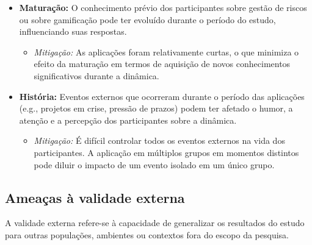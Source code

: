 \documentclass[
	12pt,
	openright,
	twoside,
	a4paper,
	english,
	brazil
	]{abntex2}
\begin{document}
\begin{itemize}
\begin{itemize}
    \end{itemize}
  \item \textbf{Maturação:} O conhecimento prévio dos participantes sobre gestão de riscos ou sobre gamificação pode ter evoluído durante o período do estudo, influenciando suas respostas.
    \begin{itemize}
    \item \textit{Mitigação:} As aplicações foram relativamente curtas, o que minimiza o efeito da maturação em termos de aquisição de novos conhecimentos significativos durante a dinâmica.
    \end{itemize}
  \item \textbf{História:} Eventos externos que ocorreram durante o período das aplicações (e.g., projetos em crise, pressão de prazos) podem ter afetado o humor, a atenção e a percepção dos participantes sobre a dinâmica.
    \begin{itemize}
    \item \textit{Mitigação:} É difícil controlar todos os eventos externos na vida dos participantes. A aplicação em múltiplos grupos em momentos distintos pode diluir o impacto de um evento isolado em um único grupo.
    \end{itemize}
\end{itemize}

\subsection{Ameaças à validade externa}
\label{sec:ameacas-externa}

A validade externa refere-se à capacidade de generalizar os resultados do estudo para outras populações, ambientes ou contextos fora do escopo da pesquisa.
\end{document}
